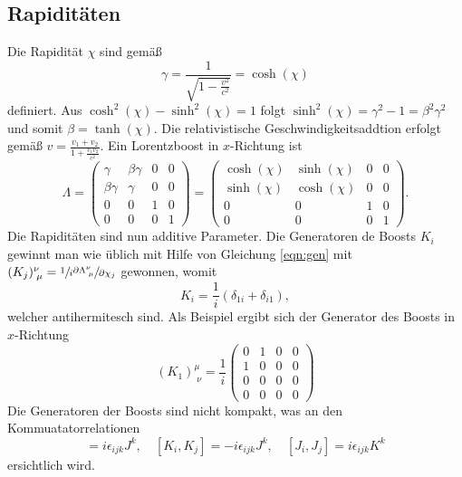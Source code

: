 \documentclass[
  captions=tableheading,  %
  titlepage=firstiscover, %
]{scrartcl}
\begin{document}
\subsection{Rapiditäten}
Die Rapidität $\chi$ sind gemäß 
\begin{equation*}
  \gamma = \frac{1}{\sqrt{1 - \frac{v^2}{c^2}}} = \cosh(\chi)
\end{equation*}
definiert.
Aus $\cosh^2(\chi) - \sinh^2(\chi) = 1$ folgt $\sinh^2(\chi) = \gamma^2 - 1 = \beta^2\gamma^2$ und somit 
$\beta = \tanh (\chi)$.
Die relativistische Geschwindigkeitsaddtion erfolgt gemäß 
$v = \frac{v_1 + v_2}{1 + \frac{v_1 v_2 }{c^2}}$.
Ein Lorentzboost in $x$-Richtung ist 
\begin{equation*}
  \Lambda  =
  \begin{pmatrix}
    \gamma & \beta \gamma & 0 & 0 \\
    \beta \gamma & \gamma & 0 & 0\\
    0 & 0 & 1 & 0 \\
    0 & 0 & 0 & 1
  \end{pmatrix}
  = 
  \begin{pmatrix}
    \cosh (\chi) & \sinh (\chi) & 0 & 0 \\
    \sinh (\chi) & \cosh (\chi) & 0 & 0\\
    0 & 0 & 1 & 0 \\
    0 & 0 & 0 & 1
  \end{pmatrix}
  .
\end{equation*}
Die Rapiditäten sind nun additive Parameter.
Die Generatoren de Boosts $K_i$ gewinnt man wie üblich mit Hilfe von 
Gleichung \eqref{eqn:gen} mit $(K_j)_{\; \mu}^{\nu} = \sfrac{1}{i} \sfrac{\partial \Lambda_{\; \mu }^{\nu}}{\partial \chi_j} $ gewonnen, womit 
\begin{equation*}
  K_i= \frac{1}{i} (\delta_{1i} + \delta_{i1}),
\end{equation*}
welcher antihermitesch sind.
Als Beispiel ergibt sich der Generator des Boosts in $x$-Richtung
\begin{equation*}
  (K_1)_{\; \nu}^{\mu} = \frac{1}{i}
  \begin{pmatrix}
    0&1&0&0\\
    1&0&0&0\\
    0&0&0&0\\
    0&0&0&0
  \end{pmatrix}
\end{equation*}
Die Generatoren der Boosts sind nicht kompakt, was an den Kommuatatorrelationen 
\begin{equation*}
  [J_i,J_j] = i \epsilon_{ijk} J^k,\quad [K_i, K_j] = - i \epsilon_{ijk} J^k, 
  \quad [J_i,J_j] = i \epsilon_{ijk} K^k
\end{equation*}
ersichtlich wird.
\end{document}

